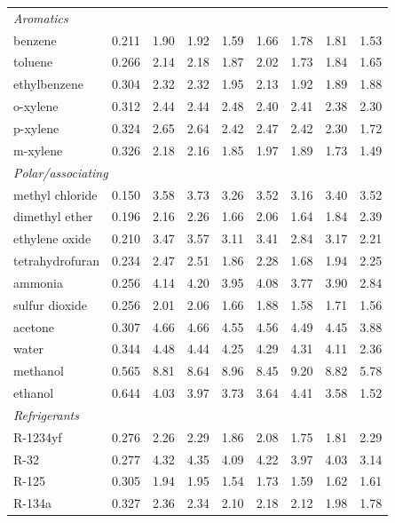 \begin{table}[H]
\begin{tabular}{lcccccccc}
\multicolumn{9}{l}{\emph{Aromatics}} \\
benzene & 0.211 & 1.90 & 1.92 & 1.59 & 1.66 & 1.78 & 1.81 & 1.53 \\
toluene & 0.266 & 2.14 & 2.18 & 1.87 & 2.02 & 1.73 & 1.84 & 1.65 \\
ethylbenzene & 0.304 & 2.32 & 2.32 & 1.95 & 2.13 & 1.92 & 1.89 & 1.88 \\
o-xylene & 0.312 & 2.44 & 2.44 & 2.48 & 2.40 & 2.41 & 2.38 & 2.30 \\
p-xylene & 0.324 & 2.65 & 2.64 & 2.42 & 2.47 & 2.42 & 2.30 & 1.72 \\
m-xylene & 0.326 & 2.18 & 2.16 & 1.85 & 1.97 & 1.89 & 1.73 & 1.49 \\
\multicolumn{9}{l}{\emph{Polar/associating}} \\
methyl chloride & 0.150 & 3.58 & 3.73 & 3.26 & 3.52 & 3.16 & 3.40 & 3.52 \\
dimethyl ether & 0.196 & 2.16 & 2.26 & 1.66 & 2.06 & 1.64 & 1.84 & 2.39 \\
ethylene oxide & 0.210 & 3.47 & 3.57 & 3.11 & 3.41 & 2.84 & 3.17 & 2.21 \\
tetrahydrofuran & 0.234 & 2.47 & 2.51 & 1.86 & 2.28 & 1.68 & 1.94 & 2.25 \\
ammonia & 0.256 & 4.14 & 4.20 & 3.95 & 4.08 & 3.77 & 3.90 & 2.84 \\
sulfur dioxide & 0.256 & 2.01 & 2.06 & 1.66 & 1.88 & 1.58 & 1.71 & 1.56 \\
acetone & 0.307 & 4.66 & 4.66 & 4.55 & 4.56 & 4.49 & 4.45 & 3.88 \\
water & 0.344 & 4.48 & 4.44 & 4.25 & 4.29 & 4.31 & 4.11 & 2.36 \\
methanol & 0.565 & 8.81 & 8.64 & 8.96 & 8.45 & 9.20 & 8.82 & 5.78 \\
ethanol & 0.644 & 4.03 & 3.97 & 3.73 & 3.64 & 4.41 & 3.58 & 1.52 \\
\multicolumn{9}{l}{\emph{Refrigerants}} \\
R-1234yf & 0.276 & 2.26 & 2.29 & 1.86 & 2.08 & 1.75 & 1.81 & 2.29 \\
R-32 & 0.277 & 4.32 & 4.35 & 4.09 & 4.22 & 3.97 & 4.03 & 3.14 \\
R-125 & 0.305 & 1.94 & 1.95 & 1.54 & 1.73 & 1.59 & 1.62 & 1.61 \\
R-134a & 0.327 & 2.36 & 2.34 & 2.10 & 2.18 & 2.12 & 1.98 & 1.78 \\
\bottomrule
\end{tabular}
\end{table}
